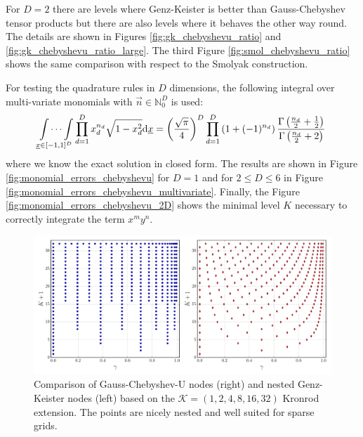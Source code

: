 \documentclass[a4paper,10pt]{article}
\begin{document}
For $D = 2$ there are levels where Genz-Keister is better than
Gauss-Chebyshev tensor products but there are also levels where
it behaves the other way round. The details are shown in Figures
\ref{fig:gk_chebyshevu_ratio} and \ref{fig:gk_chebyshevu_ratio_large}.
The third Figure \ref{fig:smol_chebyshevu_ratio} shows the same
comparison with respect to the Smolyak construction.

For testing the quadrature rules in $D$ dimensions, the following integral
over multi-variate monomials with $\vec{n} \in \mathbb{N}_0^D$ is used:
\begin{equation} \label{eq:chebyshevu_exact_solution}
  \idotsint \limits_{\underline{x} \in [-1,1]^D} \prod_{d=1}^D x_d^{n_d} \sqrt{1-x_d^2} \mathrm{d}\underline{x}
  =
  \left(\frac{\sqrt{\pi}}{4}\right)^D
  \prod_{d=1}^D \left(1 + (-1)^{n_d}\right)
  \frac{\Gamma\left(\frac{n_d}{2}+\frac{1}{2}\right)}
       {\Gamma\left(\frac{n_d}{2}+2\right)}
\end{equation}
where we know the exact solution in closed form. The results are shown in
Figure \ref{fig:monomial_errors_chebyshevu} for $D=1$ and for $2 \leq D \leq 6$
in Figure \ref{fig:monomial_errors_chebyshevu_multivariate}. Finally, the Figure
\ref{fig:monomial_errors_chebyshevu_2D} shows the minimal level $K$ necessary to
correctly integrate the term $x^m y^n$.

\begin{figure}[h]
  \centering
  \includegraphics[width=\linewidth]{./img/gk_chebyshevu_nodes_cmp.pdf}
  \caption{Comparison of Gauss-Chebyshev-U nodes (right) and nested Genz-Keister nodes (left)
  based on the $\mathcal{K} = (1,2,4,8,16,32)$ Kronrod extension. The points are
  nicely nested and well suited for sparse grids.}
  \label{fig:gk_chebyshevu_nodes_cmp}
\end{figure}
\end{document}
